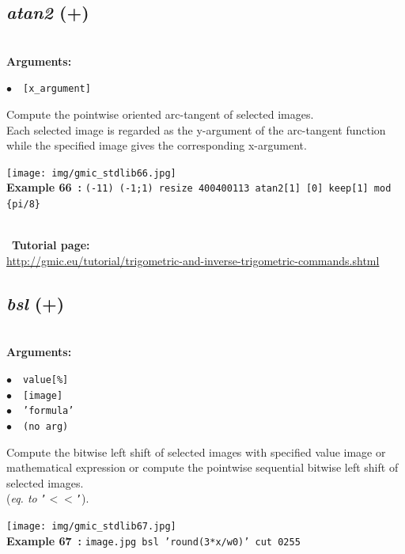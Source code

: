 \documentclass[a4paper,10.5pt,twoside]{book}
\def\comma{\discretionary{,}{}{,}}
\newcommand{\Cb}[1]{\textcolor{cb}{#1}}
\begin{document}
\subsection{\emph{atan2} (+)}\vspace*{-0.7em}
~\\\textbf{\Cb{Arguments: }}\begin{flushleft}
{\small \Cb{\hspace*{0.5cm}$\bullet$~~\texttt{[x\_argument]}}}\end{flushleft}
Compute the pointwise oriented arc-tangent of selected images.
~\\Each selected image is regarded as the y-argument of the arc-tangent function{\comma} while the
specified image gives the corresponding x-argument.
\begin{center}\texttt{[image: img/gmic\_stdlib66.jpg]}\\
{\footnotesize \textbf{Example 66~:} \texttt{(-1{\comma}1) (-1;1) resize 400{\comma}400{\comma}1{\comma}1{\comma}3 atan2[1] [0] keep[1] mod \{pi/8\}}}
\end{center}
~\\
~\textbf{Tutorial page: }\\\url{http://gmic.eu/tutorial/trigometric-and-inverse-trigometric-commands.shtml}


\subsection{\emph{bsl} (+)}\vspace*{-0.7em}
~\\\textbf{\Cb{Arguments: }}\begin{flushleft}
{\small \Cb{\hspace*{0.5cm}$\bullet$~~\texttt{value[\%]}}}~~~\\
{\small \Cb{\hspace*{0.5cm}$\bullet$~~\texttt{[image]}}}~~~\\
{\small \Cb{\hspace*{0.5cm}$\bullet$~~\texttt{'formula'}}}~~~\\
{\small \Cb{\hspace*{0.5cm}$\bullet$~~\texttt{(no arg)}}}\end{flushleft}
Compute the bitwise left shift of selected images with specified value{\comma} image or
mathematical expression{\comma} or compute the pointwise sequential bitwise left shift of
selected images.
~\\(\emph{eq. to} {\small \texttt{'$<$$<$'}}).
\begin{center}\texttt{[image: img/gmic\_stdlib67.jpg]}\\
{\footnotesize \textbf{Example 67~:} \texttt{image.jpg bsl 'round(3*x/w{\comma}0)' cut 0{\comma}255}}
\end{center}
\end{document}
